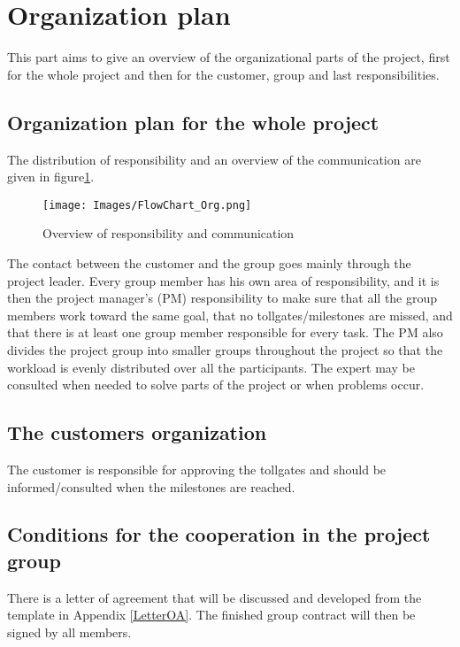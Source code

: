 \section{Organization plan} %
This part aims to give an overview of the organizational parts of the project, first for the whole project and then for the customer, group and last responsibilities.
\subsection{Organization plan for the whole project}
The distribution of responsibility and an overview of the communication are given in figure\ref{FlowOrg}.
\begin{figure}[h]
	\texttt{[image: Images/FlowChart\_Org.png]}
	\caption{Overview of responsibility and communication}
	\label{FlowOrg}
\end{figure}
The contact between the customer and the group goes mainly through the project leader. Every group member has his own area of responsibility, and it is then the project manager’s (PM) responsibility to make sure that all the group members work toward the same goal, that no tollgates/milestones are missed, and that there is at least one group member responsible for every task. The PM also divides the project group into smaller groups throughout the project so that the workload is evenly distributed over all the participants. The expert may be consulted when needed to solve parts of the project or when problems occur.
\subsection{The customers organization}
The customer is responsible for approving the tollgates and should be informed/consulted when the milestones are reached.
\subsection{Conditions for the cooperation in the project group}
There is a letter of agreement that will be discussed and developed from the template in Appendix \ref{LetterOA}. The finished group contract will then be signed by all members.
